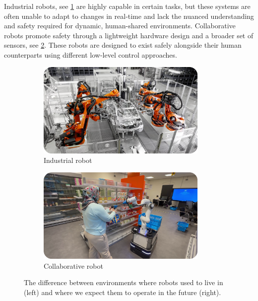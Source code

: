 Industrial robots, see \cref{fig:industrial_robot}
are highly capable in certain tasks, but
these systems are often unable to adapt to changes in
real-time and lack the nuanced understanding and safety required for
dynamic, human-shared environments. Collaborative robots
promote safety through a lightweight
hardware design and a broader set of sensors, see
\cref{fig:collaborative_robot}. These
robots are designed to exist safely alongside their human
counterparts using different low-level control approaches.
%
\begin{figure}[t]
  \centering
  \begin{subfigure}{0.5\textwidth}
    \centering
    \includegraphics[width=0.9\textwidth]{src/introduction/img/industrial_robot.png}
    \caption{Industrial robot}
    \label{fig:industrial_robot}
  \end{subfigure}%
  \begin{subfigure}{0.5\textwidth}
    \centering
    \includegraphics[width=0.9\textwidth]{src/introduction/img/collaborative_robot.png}
    \caption{Collaborative robot}
    \label{fig:collaborative_robot}
  \end{subfigure}
  \caption[]{The difference between environments where robots
  used to live in (left) \footnotemark and where we expect them to operate
  in the future (right).}
  \label{fig:different_robots}
\end{figure}

